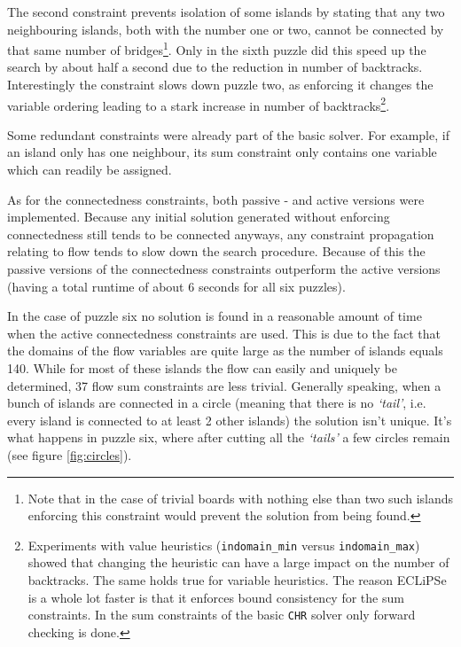 The second constraint prevents isolation of some islands by stating that any two neighbouring islands, both with the number one or two, cannot be connected by that same number of bridges\footnote{Note that in the case of trivial boards with nothing else than two such islands enforcing this constraint would prevent the solution from being found.}. Only in the sixth puzzle did this speed up the search by about half a second due to the reduction in number of backtracks. Interestingly the constraint slows down puzzle two, as enforcing it changes the variable ordering leading to a stark increase in number of backtracks\footnote{Experiments with value heuristics (\texttt{indomain\_min} versus \texttt{indomain\_max}) showed that changing the heuristic can have a large impact on the number of backtracks. The same holds true for variable heuristics. The reason ECLiPSe is a whole lot faster is that it enforces bound consistency for the sum constraints. In the sum constraints of the basic \texttt{CHR} solver only forward checking is done.}.\\\par

Some redundant constraints were already part of the basic solver. For example, if an island only has one neighbour, its sum constraint only contains one variable which can readily be assigned.\\\par

As for the connectedness constraints, both passive - and active versions were implemented. Because any initial solution generated without enforcing connectedness still tends to be connected anyways, any constraint propagation relating to flow tends to slow down the search procedure. Because of this the passive versions of the connectedness constraints outperform the active versions (having a total runtime of about 6 seconds for all six puzzles).\\\par

In the case of puzzle six no solution is found in a reasonable amount of time when the active connectedness constraints are used. This is due to the fact that the domains of the flow variables are quite large as the number of islands equals 140. While for most of these islands the flow can easily and uniquely be determined, 37 flow sum constraints are less trivial. Generally speaking, when a bunch of islands are connected in a circle (meaning that there is no \textit{`tail'}, i.e. every island is connected to at least 2 other islands) the solution isn't unique. It's what happens in puzzle six, where after cutting all the \textit{`tails'} a few circles remain (see figure \ref{fig:circles}).


